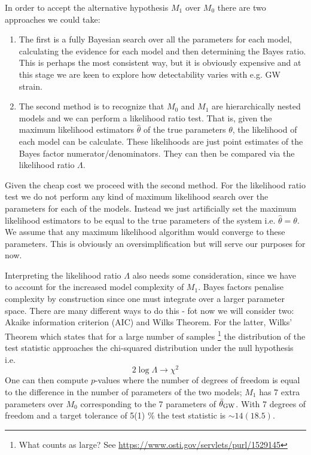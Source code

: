\documentclass[fleqn,usenatbib,useAMS]{mnras}
\begin{document}
In order to accept the alternative hypothesis $M_1$ over $M_0$ there are two approaches we could take:

\begin{enumerate}
	\item The first is a fully Bayesian search over all the parameters for each model, calculating the evidence for each model and then determining the Bayes ratio. This is perhaps the most consistent way, but it is obviously expensive and at this stage we are keen to explore how detectability varies with e.g. GW strain.
	\item The second method is to recognize that $M_0$ and $M_1$ are hierarchically nested models and we can perform a likelihood ratio test. That is, given the maximum likelihood estimators $\hat{\theta}$ of the true parameters $\theta$, the likelihood of each model can be calculate. These likelihoods are just  point estimates of the Bayes factor numerator/denominators. They can then be compared via the likelihood ratio $\Lambda$. 
\end{enumerate}
Given the cheap cost we proceed with the second method. For the likelihood ratio test we do not perform any kind of maximum likelihood search over the parameters for each of the models. Instead we just artificially set the maximum likelihood estimators to be equal to the true parameters of the system i.e. $\hat{\theta} = \theta$. We assume that any maximum likelihood algorithm would converge to these parameters. This is obviously an oversimplification but will serve our purposes for now. \newline 


\noindent Interpreting the likelihood ratio $\Lambda$ also needs some consideration, since we have to account for the increased model complexity of $M_1$. Bayes factors penalise complexity by construction since one must integrate over a larger parameter space. There are many different ways to do this - fot now we will consider two: Akaike information criterion (AIC) and Wilks Theorem. For the latter, Wilks' Theorem which states that for a large number of samples \footnote{What counts as large? See \url{https://www.osti.gov/servlets/purl/1529145}} the distribution of the test statistic approaches the chi-squared distribution under the null hypothesis i.e. 
\begin{equation}
	2 \log \Lambda \rightarrow \chi^2
\end{equation}
One can then compute $p$-values where the number of degrees of freedom is equal to the difference in the number of parameters of the two models; $M_1$ has 7 extra parameters over $M_0$ corresponding to the 7 parameters of $\bar{\theta}_{\rm GW}$. With 7 degrees of freedom and a target tolerance of 5(1) \% the test statistic is $\sim 14 (18.5)$. \newline 
\end{document}
